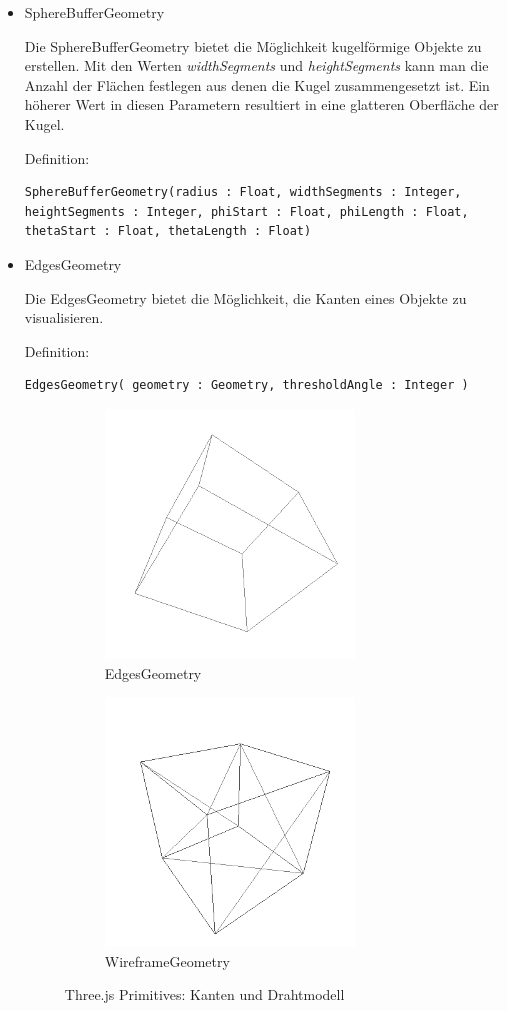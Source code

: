 \begin{itemize}
\item SphereBufferGeometry 
  
Die SphereBufferGeometry bietet die Möglichkeit kugelförmige Objekte zu erstellen. Mit den Werten \textit{widthSegments} und \textit{heightSegments} kann man die Anzahl der Flächen festlegen aus denen die Kugel zusammengesetzt ist. Ein höherer Wert in diesen Parametern resultiert in eine glatteren Oberfläche der Kugel.

Definition:
\begin{lstlisting}
SphereBufferGeometry(radius : Float, widthSegments : Integer,
heightSegments : Integer, phiStart : Float, phiLength : Float,
thetaStart : Float, thetaLength : Float)
\end{lstlisting}
\newpage
\item EdgesGeometry 
  
Die EdgesGeometry bietet die Möglichkeit, die Kanten eines Objekte zu visualisieren.

Definition:
\begin{lstlisting}
EdgesGeometry( geometry : Geometry, thresholdAngle : Integer )
\end{lstlisting}
\begin{figure}[h]
    \begin{subfigure}{0.5\textwidth}
    \centering
    \includegraphics[width=0.5\linewidth]{images/edges.png} 
    \caption{EdgesGeometry}
    \label{fig:subim1}
    \end{subfigure}
    \begin{subfigure}{0.5\textwidth}
    \centering
    \includegraphics[width=0.5\linewidth]{images/wireframe.png}
    \caption{WireframeGeometry}
    \label{fig:subim2}
    \end{subfigure}
\caption{Three.js Primitives: Kanten und Drahtmodell \cite{geometry_types}}
\label{fig:image2}
\end{figure}


\end{itemize}
